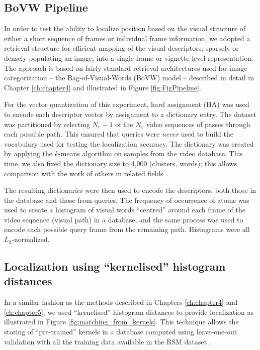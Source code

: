 \subsection{BoVW Pipeline}
In order to test the ability to localize position based on the visual structure of either a short sequence of frames or individual frame information, we adopted a retrieval structure for efficient mapping of the visual descriptors, sparsely or densely populating an image,  into a single frame or vignette-level representation.  The approach is based on fairly standard retrieval architectures used for image categorization -- the Bag-of-Visual-Words (BoVW) model -- described in detail in Chapter \ref{ch:chapter4} and illustrated in Figure \ref{fig:FigPipeline}.

For the vector quantization of this experiment, hard assignment (HA) was used to encode each descriptor vector by assignment to a dictionary entry. The dataset was partitioned by selecting $N_v-1$ of the $N_v$ video sequences of passes through each possible path. This ensured that queries were {\em never} used to build the vocabulary used for testing the localization accuracy. The dictionary was created by applying the $k$-means algorithm on samples from the video database. This time, we also fixed the dictionary size to 4,000 (clusters, words); this allows comparison with the work of others in related fields~\cite{chatfield2011devil}.

The resulting dictionaries were then used to encode the descriptors, both those in the database and those from queries.  The frequency of occurrence of atoms was used to create a histogram of visual words ``centred'' around each frame of the video sequence (visual path) in a database, and the same process was used to encode each possible query frame from the remaining path. Histograms were all $L_2$-normalized.

\subsection{Localization using ``kernelised'' histogram distances}
\label{sec:methods}

In a similar fashion as the methods described in Chapters \ref{ch:chapter4} and \ref{ch:chapter5}, we used ``kernelised'' histogram distances  to provide localization as illustrated in Figure \ref{fig:matching_from_kernels}. This technique allows the storing of ``pre-trained'' kernels in a database computed using leave-one-out validation with all the training data available in the RSM dataset \citep{Rivera-RubioRSM}.

